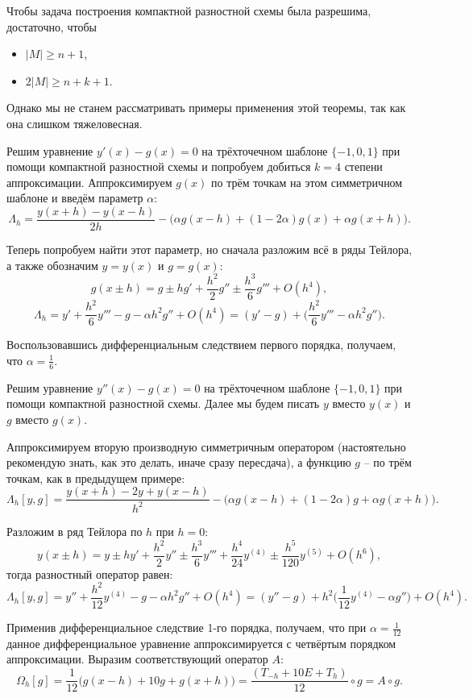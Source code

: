 \documentclass[../main.tex]{subfile}
\begin{document}
\begin{remark}
	Чтобы задача построения компактной разностной схемы была разрешима,
	достаточно, чтобы
	\begin{itemize}[nosep]
		\item $|M|\ge n+1$,
		\item $2|M|\ge n+k+1$.
	\end{itemize}
\end{remark}

Однако мы не станем рассматривать примеры применения этой теоремы, так как она
слишком тяжеловесная.

\begin{example}
	Решим уравнение $y'(x)-g(x)=0$ на трёхточечном шаблоне $\{-1,0,1\}$ при
	помощи компактной разностной схемы и попробуем добиться $k=4$ степени
	аппроксимации. Аппроксимируем $g(x)$ по трём точкам на этом симметричном
	шаблоне и введём параметр $\alpha$:
	\[\Lambda_h=\frac{y(x+h)-y(x-h)}{2h}-\big(\alpha g(x-h)+(1-2\alpha)g(x)+
	\alpha g(x+h)\big).\]

	Теперь попробуем найти этот параметр, но сначала разложим всё в ряды
	Тейлора, а также обозначим $y=y(x)$ и $g=g(x)$:
	\[g(x\pm h)=g\pm hg'+\frac{h^2}{2}g''\pm\frac{h^3}{6}g'''+O(h^4),\]
	\[\Lambda_h=y'+\frac{h^2}{6}y'''-g-\alpha h^2g''+O(h^4)=
	(y'-g)+\Big(\frac{h^2}{6}y'''-\alpha h^2g''\Big).\]

	Воспользовавшись дифференциальным следствием первого порядка, получаем,
	что $\alpha=\frac{1}{6}$.
\end{example}
\newpage

\begin{example}
	Решим уравнение $y''(x)-g(x)=0$ на трёхточечном шаблоне $\{-1,0,1\}$
	при помощи компактной разностной схемы. Далее мы будем писать $y$ вместо
	$y(x)$ и $g$ вместо $g(x)$.

	Аппроксимируем вторую производную симметричным оператором (настоятельно
	рекомендую знать, как это делать, иначе сразу пересдача), а функцию
	$g$ -- по трём точкам, как в предыдущем примере:
	\[\Lambda_h[y,g]=\frac{y(x+h)-2y+y(x-h)}{h^2}-\big(\alpha g(x-h)+
	(1-2\alpha)g+\alpha g(x+h)\big).\]

	Разложим в ряд Тейлора по $h$ при $h=0$:
	\[y(x\pm h)=y\pm hy'+\frac{h^2}{2}y''\pm \frac{h^3}{6}y'''+\frac{h^4}
	{24}y^{(4)}\pm\frac{h^5}{120}y^{(5)}+O(h^6),\]
	тогда разностный оператор равен:
	\[\Lambda_h[y,g]=y''+\frac{h^2}{12}y^{(4)}-g-\alpha h^2g''+O(h^4)=
	(y''-g)+h^2\big(\frac{1}{12}y^{(4)}-\alpha g''\big)+O(h^4).\]

	Применив дифференциальное следствие 1-го порядка, получаем, что при
	$\alpha=\frac{1}{12}$ данное дифференциальное уравнение аппроксимируется
	с четвёртым порядком аппроксимации. Выразим соответствующий оператор $A$:
	\[\Omega_h[g]=\frac{1}{12}\big(g(x-h)+10g+g(x+h)\big)=
	\frac{(T_{-h}+10E+T_h)}{12}\circ g=A\circ g.\]
\end{example}
\end{document}
